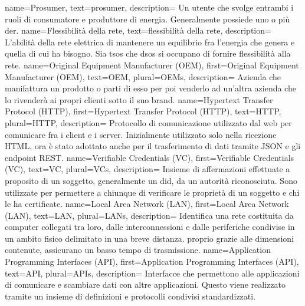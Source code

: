 {
    name={Prosumer},
    text={prosumer},
    description={
            Un utente che svolge entrambi i ruoli di consumatore e produttore di energia. Generalmente possiede uno o più \gls{der}.
        }
}
{
    name={Flessibilità della rete},
    text={flessibilità della rete},
    description={
            L'abilità della rete elettrica di mantenere un equilibrio fra l'energia che genera e quella di cui ha bisogno.
            Sia \glspl{tso} che \glspl{dso} si occupano di fornire flessibilità alla rete.
        }
}
{
    name={Original Equipment Manufacturer (OEM)},
    first={Original Equipment Manufacturer (OEM)},
    text={OEM},
    plural={OEMs},
    description={
            Azienda che manifattura un prodotto o parti di esso per poi venderlo ad un'altra azienda che lo rivenderà ai propri clienti sotto il suo brand.
        }
}
{
    name={Hypertext Transfer Protocol (HTTP)},
    first={Hypertext Transfer Protocol (HTTP)},
    text={HTTP},
    plural={HTTP},
    description={
            Protocollo di comunicazione utilizzato dal web per comunicare fra i client e i server.
            Inizialmente utilizzato solo nella ricezione HTML, ora è stato adottato anche per il trasferimento di dati tramite JSON e gli endpoint REST.
        }
}
{
    name={Verifiable Credentials (VC)},
    first={Verifiable Credentials (VC)},
    text={VC},
    plural={VCs},
    description={
            Insieme di affermazioni effettuate a proposito di un soggetto, generalmente un \gls{did}, da un autorità riconosciuta.
            Sono utilizzate per permettere a chiunque di verificare le proprietà di un soggetto e chi le ha certificate.
        }
}
{
    name={Local Area Network (LAN)},
    first={Local Area Network (LAN)},
    text={LAN},
    plural={LANs},
    description={
            Identifica una rete costituita da computer collegati tra loro, dalle interconnessioni e dalle periferiche condivise in un ambito fisico delimitato in una breve distanza.
            proprio grazie alle dimensioni contenute, assicurano un basso tempo di trasmissione.
        }
}
{
    name={Application Programming Interfaces (API)},
    first={Application Programming Interfaces (API)},
    text={API},
    plural={APIs},
    description={
            Interfacce che permettono alle applicazioni di comunicare e scambiare dati con altre applicazioni.
            Questo viene realizzato tramite un insieme di definizioni e protocolli condivisi standardizzati.
        }
}
